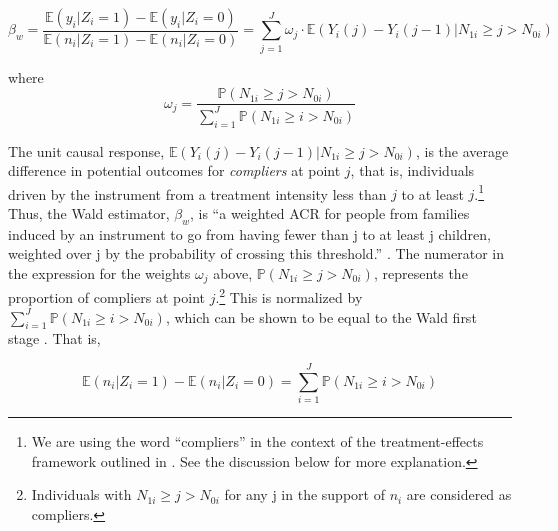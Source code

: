 \begin{equation*}
	\beta_{w} = \dfrac{\mathbb{E}(y_{i} | Z_{i} = 1) - \mathbb{E}(y_{i} | Z_{i} = 0)}{\mathbb{E}(n_{i} | Z_{i} = 1) - \mathbb{E}(n_{i} | Z_{i} = 0)} = \sum_{j = 1}^{J} \omega_{j}\cdot \mathbb{E}(Y_{i}(j) - Y_{i}(j-1) | N_{1i} \geq j > N_{0i})
\end{equation*}

where
\begin{equation*}
\omega_{j} = \dfrac{\mathbb{P}(N_{1i} \geq j > N_{0i})}{\sum_{i = 1}^{J} \mathbb{P}(N_{1i} \geq i > N_{0i})}
\end{equation*}
\vskip10pt

The unit causal response, $ \mathbb{E}(Y_{i}(j) - Y_{i}(j-1) | N_{1i} \geq j > N_{0i}) $, is the average difference in potential outcomes for \textit{compliers} at point $ j $, that is, individuals driven by the instrument from a treatment intensity less than $ j $ to at least $ j $.\footnote{We are using the word \enquote{compliers} in the context of the treatment-effects framework outlined in \textcite{angrist_identification_1996}. See the discussion below for more explanation.} Thus, the Wald estimator, $ \beta_{w} $, is \enquote{a weighted ACR for people from families induced by an instrument to go from having fewer than j to at least j children, weighted over j by the probability of crossing this threshold.} \parencite[p.~787]{angrist_multiple_2010}. The numerator in the expression for the weights $ \omega_{j} $ above, $ \mathbb{P}(N_{1i} \geq j > N_{0i}) $, represents the proportion of compliers at point $ j $.\footnote{Individuals with $ N_{1i} \geq j > N_{0i} $  for any j in the support of $ n_{i} $ are considered as compliers.} This is normalized by $ \sum_{i = 1}^{J} \mathbb{P}(N_{1i} \geq i > N_{0i}) $, which can be shown to be equal to the Wald first stage \parencite[see][p.~183]{Angrist2009}. That is,

\begin{equation*}
\mathbb{E}(n_{i} | Z_{i} = 1) - \mathbb{E}(n_{i} | Z_{i} = 0) = \sum_{i = 1}^{J} \mathbb{P}(N_{1i} \geq i > N_{0i})
\end{equation*}

